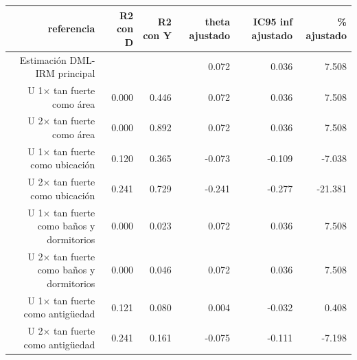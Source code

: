 \begin{tabular}{rrrrrr}
\toprule
referencia & R2 con D & R2 con Y & theta ajustado & IC95 inf ajustado & \% ajustado \\
\midrule
Estimación DML-IRM principal &  &  & 0.072 & 0.036 & 7.508 \\
U 1× tan fuerte como área & 0.000 & 0.446 & 0.072 & 0.036 & 7.508 \\
U 2× tan fuerte como área & 0.000 & 0.892 & 0.072 & 0.036 & 7.508 \\
U 1× tan fuerte como ubicación & 0.120 & 0.365 & -0.073 & -0.109 & -7.038 \\
U 2× tan fuerte como ubicación & 0.241 & 0.729 & -0.241 & -0.277 & -21.381 \\
U 1× tan fuerte como baños y dormitorios & 0.000 & 0.023 & 0.072 & 0.036 & 7.508 \\
U 2× tan fuerte como baños y dormitorios & 0.000 & 0.046 & 0.072 & 0.036 & 7.508 \\
U 1× tan fuerte como antigüedad & 0.121 & 0.080 & 0.004 & -0.032 & 0.408 \\
U 2× tan fuerte como antigüedad & 0.241 & 0.161 & -0.075 & -0.111 & -7.198 \\
\bottomrule
\end{tabular}